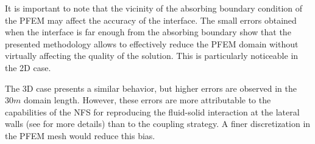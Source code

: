It is important to note that the vicinity of the absorbing boundary condition of the PFEM may affect the accuracy of the interface. The small errors obtained when the interface is far enough from the absorbing boundary show that the presented methodology allows to effectively reduce the PFEM domain without virtually affecting the quality of the solution.
This is particularly noticeable in the 2D case.


The 3D case presents a similar behavior, but higher errors are observed in the $30m$ domain length. 
However, these errors are more attributable to the capabilities of the NFS for reproducing the fluid-solid interaction at the lateral walls (see \cite{onate2022} for more details) than to the coupling strategy. A finer discretization in the PFEM mesh would reduce this bias.







